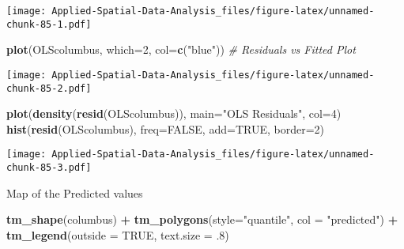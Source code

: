 \documentclass[
]{book}
\newenvironment{Shaded}{\begin{snugshade}}{\end{snugshade}}
\newcommand{\CommentTok}[1]{\textcolor[rgb]{0.56,0.35,0.01}{\textit{#1}}}
\newcommand{\DataTypeTok}[1]{\textcolor[rgb]{0.13,0.29,0.53}{#1}}
\newcommand{\DecValTok}[1]{\textcolor[rgb]{0.00,0.00,0.81}{#1}}
\newcommand{\FloatTok}[1]{\textcolor[rgb]{0.00,0.00,0.81}{#1}}
\newcommand{\KeywordTok}[1]{\textcolor[rgb]{0.13,0.29,0.53}{\textbf{#1}}}
\newcommand{\NormalTok}[1]{#1}
\newcommand{\OperatorTok}[1]{\textcolor[rgb]{0.81,0.36,0.00}{\textbf{#1}}}
\newcommand{\OtherTok}[1]{\textcolor[rgb]{0.56,0.35,0.01}{#1}}
\newcommand{\StringTok}[1]{\textcolor[rgb]{0.31,0.60,0.02}{#1}}
\begin{document}
\begin{Shaded}
\end{Shaded}

\texttt{[image: Applied-Spatial-Data-Analysis\_files/figure-latex/unnamed-chunk-85-1.pdf]}

\begin{Shaded}
\begin{Highlighting}[]
\KeywordTok{plot}\NormalTok{(OLScolumbus, }\DataTypeTok{which=}\DecValTok{2}\NormalTok{, }\DataTypeTok{col=}\KeywordTok{c}\NormalTok{(}\StringTok{"blue"}\NormalTok{)) }\CommentTok{# Residuals vs Fitted Plot}
\end{Highlighting}
\end{Shaded}

\texttt{[image: Applied-Spatial-Data-Analysis\_files/figure-latex/unnamed-chunk-85-2.pdf]}

\begin{Shaded}
\begin{Highlighting}[]
\KeywordTok{plot}\NormalTok{(}\KeywordTok{density}\NormalTok{(}\KeywordTok{resid}\NormalTok{(OLScolumbus)), }\DataTypeTok{main=}\StringTok{"OLS Residuals"}\NormalTok{, }\DataTypeTok{col=}\DecValTok{4}\NormalTok{)}
\KeywordTok{hist}\NormalTok{(}\KeywordTok{resid}\NormalTok{(OLScolumbus), }\DataTypeTok{freq=}\OtherTok{FALSE}\NormalTok{, }\DataTypeTok{add=}\OtherTok{TRUE}\NormalTok{, }\DataTypeTok{border=}\DecValTok{2}\NormalTok{)}
\end{Highlighting}
\end{Shaded}

\texttt{[image: Applied-Spatial-Data-Analysis\_files/figure-latex/unnamed-chunk-85-3.pdf]}

Map of the Predicted values

\begin{Shaded}
\begin{Highlighting}[]
\KeywordTok{tm_shape}\NormalTok{(columbus) }\OperatorTok{+}\StringTok{ }\KeywordTok{tm_polygons}\NormalTok{(}\DataTypeTok{style=}\StringTok{"quantile"}\NormalTok{, }\DataTypeTok{col =} \StringTok{"predicted"}\NormalTok{) }\OperatorTok{+}
\StringTok{     }\KeywordTok{tm_legend}\NormalTok{(}\DataTypeTok{outside =} \OtherTok{TRUE}\NormalTok{, }\DataTypeTok{text.size =} \FloatTok{.8}\NormalTok{)}
\end{Highlighting}
\end{Shaded}
\end{document}
